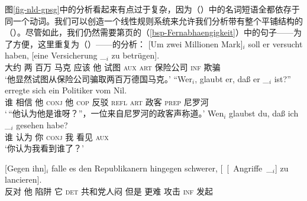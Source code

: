 图\ref{fig-nld-gpsg}中的分析看起来有点过于复杂，因为（）中的名词短语全都依存于同一个动词。我们可以创造一个线性规则系统来允许我们分析带有整个平铺结构的（）。尽管如此，我们仍然需要第\pageref{bsp-Fernabhaengigkeit}页的（\ref{bsp-Fernabhaengigkeit}）中的句子——为了方便，这里重复为（）——的分析：
\eal
\ex\label{bsp-um-zwei-millionen-zwei}
\gll {}[Um zwei Millionen Mark]$_i$ soll er versucht haben, [eine Versicherung \_$_i$ zu betrügen].\footnotemark\\
       {}\spacebr{}大约 两 百万 马克 应该 他 试图 \textsc{aux} \spacebr{}\textsc{art} 保险公司 {} \textsc{inf} 欺骗\\
\glt `他显然试图从保险公司骗取两百万德国马克。'
\ex
\gll "`Wer$_i$, glaubt er, daß er \_$_i$ ist?"' erregte sich ein Politiker vom Nil.\footnotemark\\
    \spacebr{}谁 相信 他 \textsc{conj} 他 {} \textsc{cop} 反驳 \textsc{refl} \textsc{art} 政客 \textsc{prep} 尼罗河\\
\glt `\,“他认为他是谁呀？”，一位来自尼罗河的政客声称道。'
\ex\label{ex-wen-glaubst-du-dass-zwei}
\gll Wen$_i$ glaubst du, daß ich \_$_i$ gesehen habe?\footnotemark\\
     谁 认为 你 \textsc{conj} 我 {} 看见 \textsc{aux}\\
\glt `你认为我看到谁了？'
\ex
{\raggedright
\gll {}[Gegen ihn]$_i$ falle es den Republikanern hingegen schwerer, [~[~Angriffe~\_$_i$] zu lancieren].\footnotemark\\
	 {}\spacebr{}反对 他 陷阱 它 \textsc{det} 共和党人闷 但是 更难
         \hspaceThis{[~[~}攻击 \textsc{inf} 发起\\
\par}
